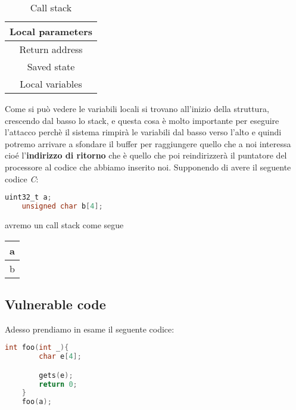 \begin{center}
    \begin{table}[h!]
        \centering
        \begin{tabular}{|c|}
            \hline
            Local parameters \\
            \hline
            Return address \\
            \hline
            Saved state \\
            \hline
            Local variables \\
            \hline
        \end{tabular}
        \caption{Call stack}
    \end{table}
\end{center}

Come si può vedere le variabili locali si trovano all'inizio della struttura, crescendo dal basso lo stack, e questa cosa è molto importante per eseguire l'attacco perchè il sistema rimpirà le variabili dal basso verso l'alto e quindi potremo arrivare a sfondare il buffer per raggiungere quello che a noi interessa cioé l'\textbf{indirizzo di ritorno} che è quello che poi reindirizzerà il puntatore del processore al codice che abbiamo inserito noi.
Supponendo di avere il seguente codice \textit{C}:
\begin{lstlisting}[language=C]
    uint32_t a;
    unsigned char b[4];
\end{lstlisting}
avremo un call stack come segue
\begin{center}
    \begin{table}[h!]
        \centering
        \begin{tabular}{|c|}
            \hline
            a \\
            \hline
            b \\
            \hline
        \end{tabular}
    \end{table}
\end{center}

\subsection{Vulnerable code}
Adesso prendiamo in esame il seguente codice: 
\begin{lstlisting}[language=C]
    int foo(int _){
        char e[4];

        gets(e);
        return 0;
    }
    foo(a);
\end{lstlisting}


